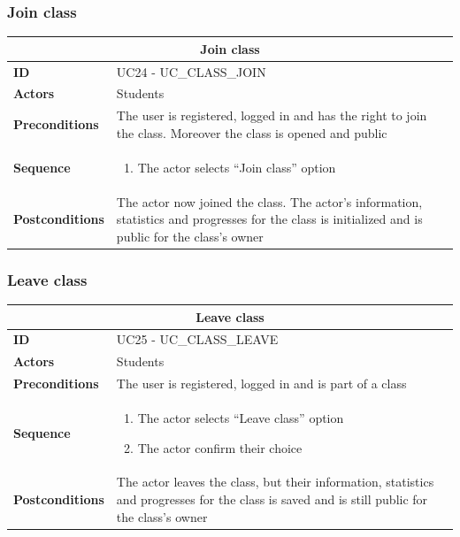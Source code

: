 \subsubsection{Join class}
\begin{tabular}{|m{2.5cm}|m{8cm}|}
	\hline
	\multicolumn{2}{|c|}{Join class} \\
	\hline
	\textbf{ID} & UC24 - UC\_CLASS\_JOIN \\
	\hline
	\textbf{Actors} & Students \\
	\hline
	\textbf{Preconditions} & The user is registered, logged in and has the right to join the class. Moreover the class is opened and public \\
	\hline
	\textbf{Sequence} & 
	\begin{enumerate}
		\item The actor selects “Join class” option
	\end{enumerate} \\
	\hline
	\textbf{Postconditions} & The actor now joined the class. The actor’s information, statistics and progresses for the class is initialized and is public for the class’s owner \\
	\hline
\end{tabular}

\subsubsection{Leave class}
\begin{tabular}{|m{2.5cm}|m{8cm}|}
	\hline
	\multicolumn{2}{|c|}{Leave class} \\
	\hline
	\textbf{ID} & UC25 - UC\_CLASS\_LEAVE \\
	\hline
	\textbf{Actors} & Students \\
	\hline
	\textbf{Preconditions} & The user is registered, logged in and is part of a class\\
	\hline
	\textbf{Sequence} & 
	\begin{enumerate}
		\item The actor selects “Leave class” option
		\item The actor confirm their choice
	\end{enumerate} \\
	\hline
	\textbf{Postconditions} & The actor leaves the class, but their information, statistics and progresses for the class is saved and is still public for the class’s owner \\
	\hline
\end{tabular}

